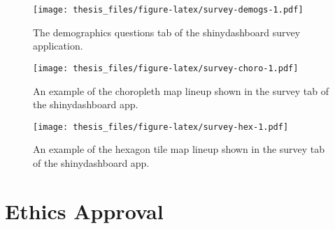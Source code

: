 \documentclass{monashthesis}
\begin{document}
\begin{figure}
\centering
\texttt{[image: thesis\_files/figure-latex/survey-demogs-1.pdf]}
\caption{\label{fig:survey-demogs}The demographics questions tab of the shinydashboard survey application.}
\end{figure}

\begin{Shaded}
\begin{Highlighting}[]
\NormalTok{() }\OperatorTok{+}
\StringTok{  }\OperatorTok{::}\NormalTok{(}\NormalTok{(}\NormalTok{)))}
\end{Highlighting}
\end{Shaded}

\begin{figure}
\centering
\texttt{[image: thesis\_files/figure-latex/survey-choro-1.pdf]}
\caption{\label{fig:survey-choro}An example of the choropleth map lineup shown in the survey tab of the shinydashboard app.}
\end{figure}

\begin{Shaded}
\begin{Highlighting}[]
\NormalTok{() }\OperatorTok{+}
\StringTok{  }\OperatorTok{::}\NormalTok{(}\NormalTok{(}\NormalTok{)))}
\end{Highlighting}
\end{Shaded}

\begin{figure}
\centering
\texttt{[image: thesis\_files/figure-latex/survey-hex-1.pdf]}
\caption{\label{fig:survey-hex}An example of the hexagon tile map lineup shown in the survey tab of the shinydashboard app.}
\end{figure}

\hypertarget{ch:ethics}{%
\chapter{Ethics Approval}\label{ch:ethics}}



\printbibliography[heading=bibintoc]
\end{document}
